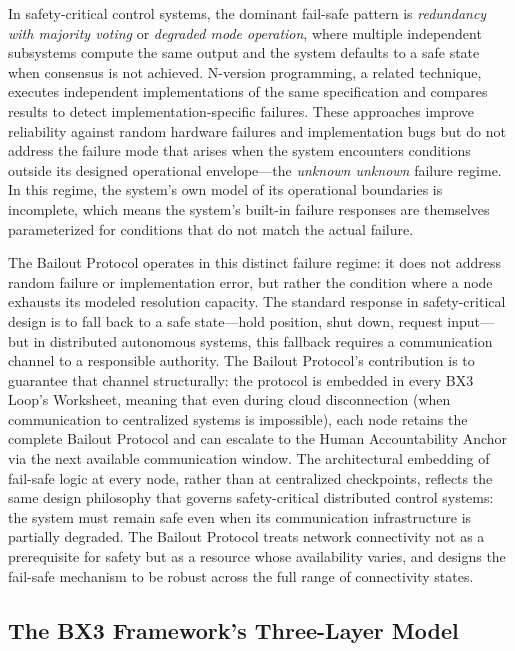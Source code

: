 \documentclass[12pt]{article}
\begin{document}
In safety-critical control systems, the dominant fail-safe pattern is \textit{redundancy with majority voting} or \textit{degraded mode operation}, where multiple independent subsystems compute the same output and the system defaults to a safe state when consensus is not achieved. N-version programming, a related technique, executes independent implementations of the same specification and compares results to detect implementation-specific failures. These approaches improve reliability against random hardware failures and implementation bugs but do not address the failure mode that arises when the system encounters conditions outside its designed operational envelope—the \textit{unknown unknown} failure regime. In this regime, the system's own model of its operational boundaries is incomplete, which means the system's built-in failure responses are themselves parameterized for conditions that do not match the actual failure.

The Bailout Protocol operates in this distinct failure regime: it does not address random failure or implementation error, but rather the condition where a node exhausts its modeled resolution capacity. The standard response in safety-critical design is to fall back to a safe state—hold position, shut down, request input—but in distributed autonomous systems, this fallback requires a communication channel to a responsible authority. The Bailout Protocol's contribution is to guarantee that channel structurally: the protocol is embedded in every BX3 Loop's Worksheet, meaning that even during cloud disconnection (when communication to centralized systems is impossible), each node retains the complete Bailout Protocol and can escalate to the Human Accountability Anchor via the next available communication window. The architectural embedding of fail-safe logic at every node, rather than at centralized checkpoints, reflects the same design philosophy that governs safety-critical distributed control systems: the system must remain safe even when its communication infrastructure is partially degraded. The Bailout Protocol treats network connectivity not as a prerequisite for safety but as a resource whose availability varies, and designs the fail-safe mechanism to be robust across the full range of connectivity states.

\subsection{The BX3 Framework's Three-Layer Model}
\end{document}
